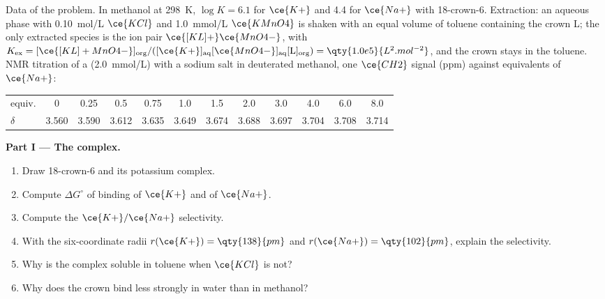 \begin{problem}
\label{pb:b3:supramolecular:1}
Data of the problem. In methanol at \qty{298}{K}, $\log K = 6.1$ for $\ce{K+}$ and 4.4 for $\ce{Na+}$ with
18-crown-6. Extraction: an aqueous phase with \qty{0.10}{mol/L} $\ce{KCl}$ and \qty{1.0}{mmol/L} $\ce{KMnO4}$ is shaken
with an equal volume of toluene containing the crown L; the only extracted
species is the ion pair $\ce{[KL]+}\ce{MnO4-}$, with
$K_{\mathrm{ex}} = [\ce{[KL]+MnO4-}]_{\mathrm{org}}/([\ce{K+}]_{\mathrm{aq}}[\ce{MnO4-}]_{\mathrm{aq}}[\mathrm L]_{\mathrm{org}}) = \qty{1.0e5}{L^2.mol^{-2}}$, and the crown stays in the toluene. NMR titration of a
 (\qty{2.0}{mmol/L}) with a sodium salt in deuterated methanol, one $\ce{CH2}$ signal
(ppm) against equivalents of $\ce{Na+}$:

\begin{center}\small
\begin{tabular}{l*{11}{c}}
\hline
equiv. & 0 & 0.25 & 0.5 & 0.75 & 1.0 & 1.5 & 2.0 & 3.0 & 4.0 & 6.0 & 8.0\\
$\delta$ & 3.560 & 3.590 & 3.612 & 3.635 & 3.649 & 3.674 & 3.688 & 3.697 & 3.704 & 3.708 & 3.714\\
\hline
\end{tabular}
\end{center}

\medskip\noindent\textbf{Part I --- The complex.}
\begin{enumerate}
  \item Draw 18-crown-6 and its potassium complex.
  \item Compute $\Delta G^\circ$ of binding of $\ce{K+}$ and of $\ce{Na+}$.
  \item Compute the $\ce{K+}/\ce{Na+}$ selectivity.
  \item With the six-coordinate radii $r(\ce{K+}) = \qty{138}{pm}$ and $r(\ce{Na+}) = \qty{102}{pm}$, explain the selectivity.
  \item Why is the complex soluble in toluene when $\ce{KCl}$ is not?
  \item Why does the crown bind less strongly in water than in methanol?
\end{enumerate}


\end{problem}
